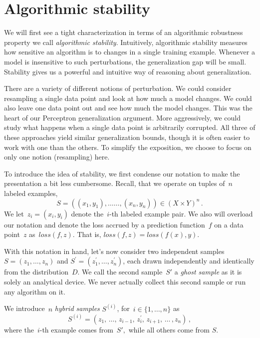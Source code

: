 \documentclass{tufte-book}
\begin{document}
\hypertarget{algorithmic-stability}{%
\section{Algorithmic stability}\label{algorithmic-stability}}


We will first see a tight characterization in terms of an algorithmic
robustness property we call \emph{algorithmic stability}. Intuitively,
algorithmic stability measures how sensitive an algorithm is to changes
in a single training example. Whenever a model is insensitive to such
perturbations, the generalization gap will be small. Stability gives us
a powerful and intuitive way of reasoning about generalization.

There are a variety of different notions of perturbation. We could
consider resampling a single data point and look at how much a model
changes. We could also leave one data point out and see how much the
model changes. This was the heart of our Perceptron generalization
argument. More aggressively, we could study what happens when a single
data point is arbitrarily corrupted. All three of these approaches yield
similar generalization bounds, though it is often easier to work with
one than the others. To simplify the exposition, we choose to focus on
only one notion (resampling) here.

To introduce the idea of stability, we first condense our notation to
make the presentation a bit less cumbersome. Recall, that we operate on
tuples of~\(n\) labeled examples, \[
S=((x_1,y_1),\dots\dots,(x_n,y_n))\in(X\times Y)^n\,.
\] We let~\(z_i=(x_i,y_i)\) denote the~\(i\)-th labeled example pair. We
also will overload our notation and denote the loss accrued by a
prediction function~\(f\) on a data point~\(z\)
as~\(\mathit{loss}(f,z)\). That is,
\(\mathit{loss}(f,z) = \mathit{loss}(f(x),y)\).

With this notation in hand, let's now consider two independent samples
\(S = (z_1, \dots , z_n)\) and
\(S^{\prime} = (z^{\prime}_1, \dots ,z^{\prime}_{n})\), each drawn
independently and identically from the distribution~\(D\). We call the
second sample~\(S'\) a \emph{ghost sample} as it is solely an analytical
device. We never actually collect this second sample or run any
algorithm on it.

We introduce~\(n\) \emph{hybrid samples} \(S^{(i)}\),
for~\(i\in\{1, \dots, n\}\) as \[
S^{(i)} = (z_1, \,\dots ,\, z_{i-1}, \,z_{i}^{\prime},\, z_{i+1}, \,\dots \,,z_{n})\,,
\] where the~\(i\)-th example comes from~\(S',\) while all others come
from \(S.\)
\end{document}
